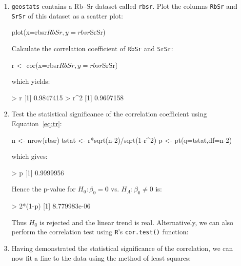 \begin{enumerate}

\item \texttt{geostats} contains a Rb--Sr dataset called
  \texttt{rbsr}.  Plot the columns \texttt{RbSr} and \texttt{SrSr} of
  this dataset as a scatter plot:

\begin{console}
plot(x=rbsr$RbSr,y=rbsr$SrSr)
\end{console}

Calculate the correlation coefficient of \texttt{RbSr} and
\texttt{SrSr}:

\begin{console}
r <- cor(x=rbsr$RbSr,y=rbsr$SrSr)
\end{console}

\noindent which yields:

\begin{console}
> r
[1] 0.9847415
> r^2
[1] 0.9697158
\end{console}

\item Test the statistical significance of the correlation coefficient
  using Equation~\ref{eq:tr}:

\begin{script}
n <- nrow(rbsr)
tstat <- r*sqrt(n-2)/sqrt(1-r^2)
p <- pt(q=tstat,df=n-2)
\end{script}

\noindent which gives:

\begin{console}
> p
[1] 0.9999956
\end{console}

Hence the p-value for $H_0: \beta_0=0$ vs. $H_{\!A}: \beta_0\neq{0}$
is:

\begin{console}
> 2*(1-p)
[1] 8.779983e-06
\end{console}

Thus $H_0$ is rejected and the linear trend is
real. Alternatively, we can also perform the correlation test using
\texttt{R}'s \texttt{cor.test()} function:


\item Having demonstrated the statistical significance of the
  correlation, we can now fit a line to the data using the method of
  least squares:


\end{enumerate}
